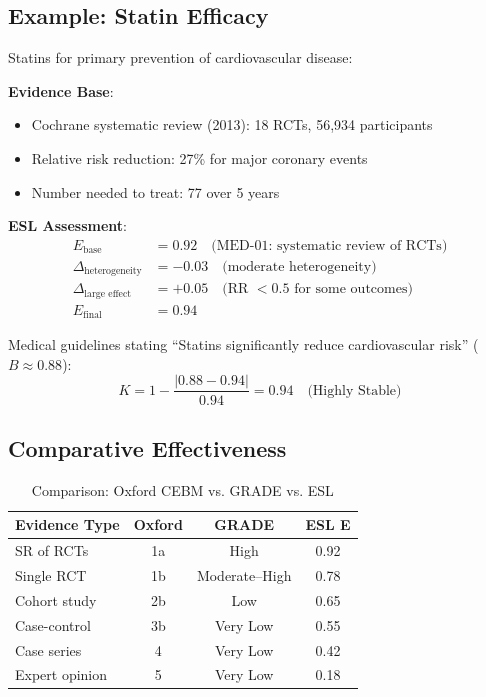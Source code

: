\documentclass[11pt,a4paper]{article}
\theoremstyle{remark}
\begin{document}
\subsection{Example: Statin Efficacy}

\begin{examplebox}[title={Statins for Cardiovascular Prevention}]
Statins for primary prevention of cardiovascular disease:

\textbf{Evidence Base}:
\begin{itemize}
    \item Cochrane systematic review (2013): 18 RCTs, 56,934 participants
    \item Relative risk reduction: 27\% for major coronary events
    \item Number needed to treat: 77 over 5 years
\end{itemize}

\textbf{ESL Assessment}:
\begin{align}
E_{\text{base}} &= 0.92 \quad \text{(MED-01: systematic review of RCTs)} \\
\Delta_{\text{heterogeneity}} &= -0.03 \quad \text{(moderate heterogeneity)} \\
\Delta_{\text{large effect}} &= +0.05 \quad \text{(RR $< 0.5$ for some outcomes)} \\
E_{\text{final}} &= 0.94
\end{align}

Medical guidelines stating ``Statins significantly reduce cardiovascular risk'' ($B \approx 0.88$):
\begin{equation}
K = 1 - \frac{|0.88 - 0.94|}{0.94} = 0.94 \quad \text{(Highly Stable)}
\end{equation}
\end{examplebox}

\subsection{Comparative Effectiveness}

\begin{table}[h]
\centering
\caption{Comparison: Oxford CEBM vs. GRADE vs. ESL}
\label{tab:compare-medical}
\begin{tabular}{lccc}
\toprule
\textbf{Evidence Type} & \textbf{Oxford} & \textbf{GRADE} & \textbf{ESL E} \\
\midrule
SR of RCTs & 1a & High & 0.92 \\
Single RCT & 1b & Moderate--High & 0.78 \\
Cohort study & 2b & Low & 0.65 \\
Case-control & 3b & Very Low & 0.55 \\
Case series & 4 & Very Low & 0.42 \\
Expert opinion & 5 & Very Low & 0.18 \\
\bottomrule
\end{tabular}
\end{table}
\end{document}
